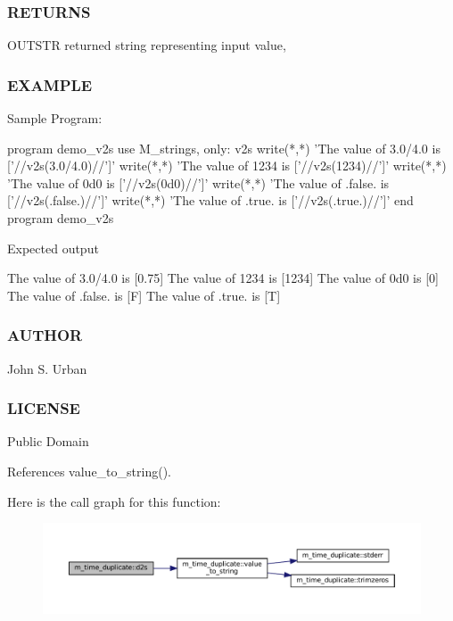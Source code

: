 \subsubsection*{R\+E\+T\+U\+R\+NS}

O\+U\+T\+S\+TR returned string representing input value,

\subsubsection*{E\+X\+A\+M\+P\+LE}

\begin{DoxyVerb}Sample Program:

 program demo_v2s
 use M_strings, only: v2s
 write(*,*) 'The value of 3.0/4.0 is ['//v2s(3.0/4.0)//']'
 write(*,*) 'The value of 1234    is ['//v2s(1234)//']'
 write(*,*) 'The value of 0d0     is ['//v2s(0d0)//']'
 write(*,*) 'The value of .false. is ['//v2s(.false.)//']'
 write(*,*) 'The value of .true. is  ['//v2s(.true.)//']'
 end program demo_v2s

Expected output

 The value of 3.0/4.0 is [0.75]
 The value of 1234    is [1234]
 The value of 0d0     is [0]
 The value of .false. is [F]
 The value of .true. is  [T]
\end{DoxyVerb}


\subsubsection*{A\+U\+T\+H\+OR}

John S. Urban \subsubsection*{L\+I\+C\+E\+N\+SE}

Public Domain 

References value\+\_\+to\+\_\+string().

Here is the call graph for this function\+:\nopagebreak
\begin{figure}[H]
\begin{center}
\leavevmode
\includegraphics[width=350pt]{namespacem__time__duplicate_a84f53c1e0d6c1c9fe70b19549921d14b_cgraph}
\end{center}
\end{figure}
\mbox{\label{namespacem__time__duplicate_a66a83a4b3d6324843c984658784b2c4e}} 
